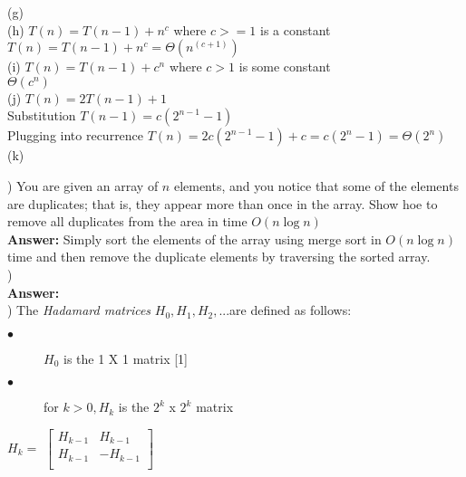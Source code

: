 \documentclass{article}
\begin{document}
\indent (g) \\

\indent (h) $T(n) = T(n - 1) + n^c$ where $c >= 1$ is a constant \\
\indent \indent $T(n) = T(n - 1) + n^c = \Theta(n^{(c + 1)})$ \\

\indent (i) $T(n) = T(n - 1) + c^n$ where $c > 1$ is some constant \\
\indent \indent $\Theta(c^n)$ \\

\indent (j) $T(n) = 2T(n - 1) + 1$ \\
\indent \indent Substitution $T(n - 1) = c(2^{n - 1} - 1)$ \\
\indent \indent Plugging into recurrence $T(n) = 2c(2^{n - 1} - 1) + c = c(2^n - 1) = \Theta(2^n)$ \\

\indent (k)

\vspace{.3in}
) You are given an array of $n$ elements, and you notice that some of the elements are duplicates; that is, they appear more than once in the array. Show hoe to remove all duplicates from the area in time $O(n \log n)$\\
\vspace{.1in}
{\bf Answer:} Simply sort the elements of the array using merge sort in $O(n \log n)$ time and then remove the duplicate elements by traversing the sorted array.\\

\vspace{.3in}
) \\
\vspace{.1in}
{\bf Answer:} \\

\vspace{.3in}
) The \textit{Hadamard matrices} $H_{0}, H_{1}, H_{2}, $...are defined as follows: \\
\begin{description}
	\item[$\bullet$] $H_{0}$ is the 1 X 1 matrix [1]
	\item[$\bullet$] for $k > 0, H_{k}$ is the $2^k$ x $2^k$ matrix
\end{description}  
	
\indent \indent \indent \indent \indent \indent \indent \indent \indent $H_{k} = $
$\begin{bmatrix}
	H_{k - 1} & H_{k - 1} \\
	H_{k - 1} & -H_{k - 1} \\
\end{bmatrix}$ \\
\end{document}
